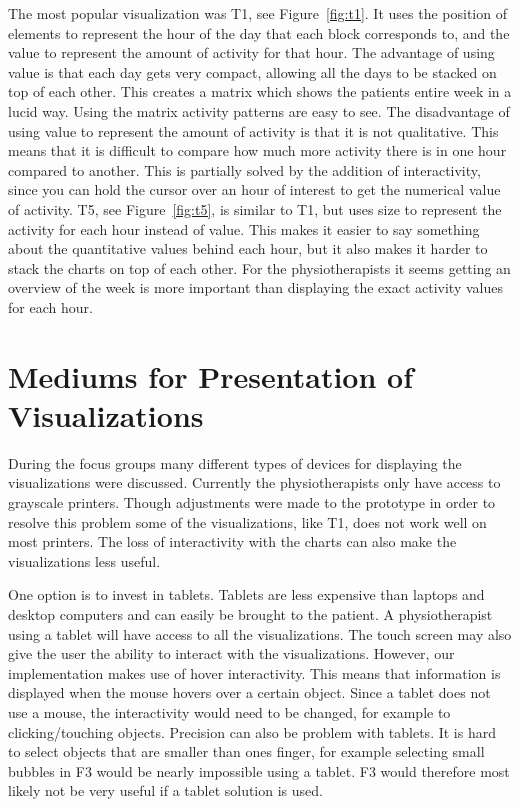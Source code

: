 The most popular visualization was T1, see Figure~\ref{fig:t1}. It uses the position of elements to represent the hour of the day that each block corresponds to, and the value to represent the amount of activity for that hour. The advantage of using value is that each day gets very compact, allowing all the days to be stacked on top of each other. This creates a matrix which shows the patients entire week in a lucid way. Using the matrix activity patterns are easy to see. The disadvantage of using value to represent the amount of activity is that it is not qualitative. This means that it is difficult to compare how much more activity there is in one hour compared to another. This is partially solved by the addition of interactivity, since you can hold the cursor over an hour of interest to get the numerical value of activity. T5, see Figure~\ref{fig:t5}, is similar to T1, but uses size to represent the activity for each hour instead of value. This makes it easier to say something about the quantitative values behind each hour, but it also makes it harder to stack the charts on top of each other. For the physiotherapists it seems getting an overview of the week is more important than displaying the exact activity values for each hour. 

\section{Mediums for Presentation of Visualizations}
During the focus groups many different types of devices for displaying the visualizations were discussed. Currently the physiotherapists only have access to grayscale printers. Though adjustments were made to the prototype in order to resolve this problem some of the visualizations, like T1, does not work well on most printers. The loss of interactivity with the charts can also make the visualizations less useful.

One option is to invest in tablets. Tablets are less expensive than laptops and desktop computers and can easily be brought to the patient. A physiotherapist using a tablet will have access to all the visualizations. The touch screen may also give the user the ability to interact with the visualizations. However, our implementation makes use of hover interactivity. This means that information is displayed when the mouse hovers over a certain object. Since a tablet does not use a mouse, the interactivity would need to be changed, for example to clicking/touching objects. Precision can also be problem with tablets. It is hard to select objects that are smaller than ones finger, for example selecting small bubbles in F3 would be nearly impossible using a tablet. F3 would therefore most likely not be very useful if a tablet solution is used. 

